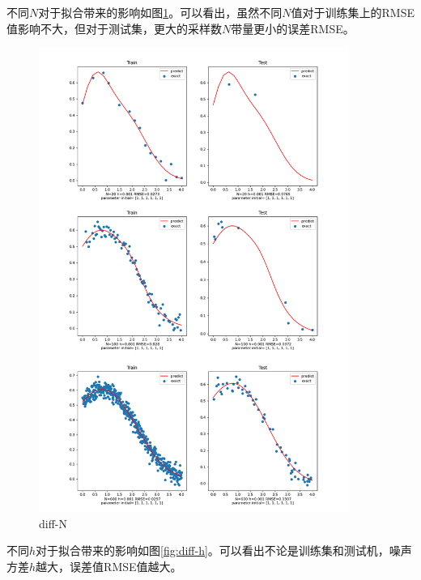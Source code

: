 不同$N$对于拟合带来的影响如图\ref{fig:diff-N}。可以看出，虽然不同$N$值对于训练集上的RMSE值影响不大，但对于测试集，更大的采样数$N$带量更小的误差RMSE。
\begin{figure}[H]
    \begin{center}
        \includegraphics[width=0.9\textwidth]{img/1-diff-N.png}
    \end{center}
   \caption[]{diff-N}
    \label{fig:diff-N}
\end{figure} 

不同$h$对于拟合带来的影响如图\ref{fig:diff-h}。可以看出不论是训练集和测试机，噪声方差$h$越大，误差值RMSE值越大。

